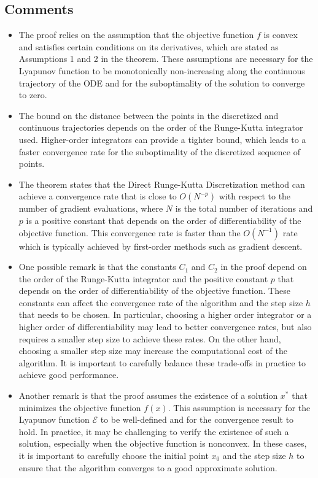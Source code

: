 \subsection{Comments}
\begin{itemize}
    \item The proof relies on the assumption that the objective function $f$ is convex and satisfies certain conditions on its derivatives, which are stated as Assumptions 1 and 2 in the theorem. These assumptions are necessary for the Lyapunov function to be monotonically non-increasing along the continuous trajectory of the ODE and for the suboptimality of the solution to converge to zero.

    \item The bound on the distance between the points in the discretized and continuous trajectories depends on the order of the Runge-Kutta integrator used. Higher-order integrators can provide a tighter bound, which leads to a faster convergence rate for the suboptimality of the discretized sequence of points.

    \item The theorem states that the Direct Runge-Kutta Discretization method can achieve a convergence rate that is close to $O(N^{-p})$ with respect to the number of gradient evaluations, where $N$ is the total number of iterations and $p$ is a positive constant that depends on the order of differentiability of the objective function. This convergence rate is faster than the $O(N^{-1})$ rate which is typically achieved by first-order methods such as gradient descent.

    \item One possible remark is that the constants $C_1$ and $C_2$ in the proof depend on the order of the Runge-Kutta integrator and the positive constant $p$ that depends on the order of differentiability of the objective function. These constants can affect the convergence rate of the algorithm and the step size $h$ that needs to be chosen. In particular, choosing a higher order integrator or a higher order of differentiability may lead to better convergence rates, but also requires a smaller step size to achieve these rates. On the other hand, choosing a smaller step size may increase the computational cost of the algorithm. It is important to carefully balance these trade-offs in practice to achieve good performance.

    \item Another remark is that the proof assumes the existence of a solution $x^*$ that minimizes the objective function $f(x)$. This assumption is necessary for the Lyapunov function $\mathcal{E}$ to be well-defined and for the convergence result to hold. In practice, it may be challenging to verify the existence of such a solution, especially when the objective function is nonconvex. In these cases, it is important to carefully choose the initial point $x_0$ and the step size $h$ to ensure that the algorithm converges to a good approximate solution.


\end{itemize}
